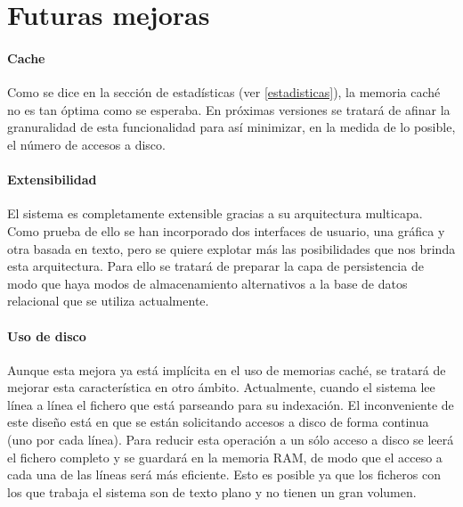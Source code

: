 \section{Futuras mejoras}

\paragraph{Cache} Como se dice en la sección de estadísticas (ver
\ref{estadisticas}), la memoria caché no es tan óptima como se
esperaba. En próximas versiones se tratará de afinar la granuralidad
de esta funcionalidad para así minimizar, en la medida de lo posible,
el número de accesos a disco.

\paragraph{Extensibilidad} El sistema es completamente extensible
gracias a su arquitectura multicapa. Como prueba de ello se han
incorporado dos interfaces de usuario, una gráfica y otra basada en
texto, pero se quiere explotar más las posibilidades que nos brinda
esta arquitectura. Para ello se tratará de preparar la capa de
persistencia de modo que haya modos de almacenamiento alternativos a
la base de datos relacional que se utiliza actualmente.

\paragraph{Uso de disco} Aunque esta mejora ya está implícita en el
uso de memorias caché, se tratará de mejorar esta característica en
otro ámbito. Actualmente, cuando el sistema lee línea a línea el
fichero que está parseando para su indexación. El inconveniente de
este diseño está en que se están solicitando accesos a disco de forma
continua (uno por cada línea). Para reducir esta operación a un sólo
acceso a disco se leerá el fichero completo y se guardará en la
memoria RAM, de modo que el acceso a cada una de las líneas será más
eficiente. Esto es posible ya que los ficheros con los que trabaja el
sistema son de texto plano y no tienen un gran volumen.

